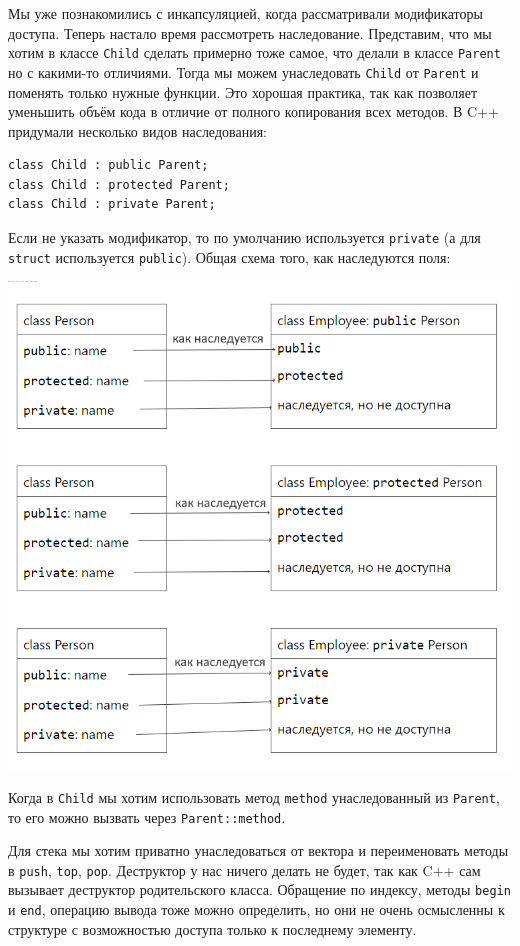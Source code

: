 Мы уже познакомились с инкапсуляцией, когда рассматривали модификаторы доступа. Теперь настало время рассмотреть наследование. Представим, что мы хотим в классе \texttt{Child} сделать примерно тоже самое, что делали в классе \texttt{Parent} но с какими-то отличиями. Тогда мы можем унаследовать \texttt{Child} от \texttt{Parent} и поменять только нужные функции. Это хорошая практика, так как позволяет уменьшить объём кода в отличие от полного копирования всех методов. В C++ придумали несколько видов наследования:
\begin{verbatim}
class Child : public Parent;
class Child : protected Parent;
class Child : private Parent;
\end{verbatim}
Если не указать модификатор, то по умолчанию используется \texttt{private} (а для \texttt{struct} используется \texttt{public}). Общая схема того, как наследуются поля:

\includegraphics[scale=0.4]{lessons/4-inheritance.png}

Когда в \texttt{Child} мы хотим использовать метод \texttt{method} унаследованный из \texttt{Parent}, то его можно вызвать через \texttt{Parent::method}.

Для стека мы хотим приватно унаследоваться от вектора и переименовать методы в \texttt{push}, \texttt{top}, \texttt{pop}. Деструктор у нас ничего делать не будет, так как C++ сам вызывает деструктор родительского класса. Обращение по индексу, методы \texttt{begin} и \texttt{end}, операцию вывода тоже можно определить, но они не очень осмысленны к структуре с возможностью доступа только к последнему элементу.

